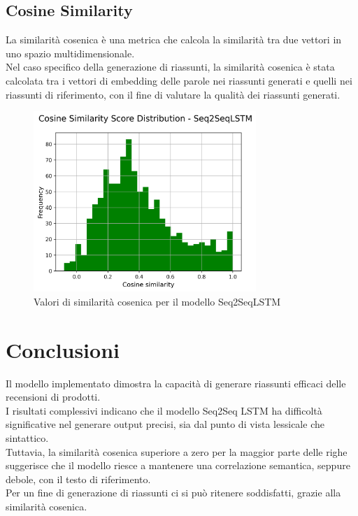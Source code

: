 \documentclass[a4paper, 12pt]{article}
\begin{document}
\subsection{Cosine Similarity}
La similarità cosenica è una metrica che calcola la similarità tra due vettori in uno spazio multidimensionale.\\
Nel caso specifico della generazione di riassunti, la similarità cosenica è stata calcolata tra i vettori di embedding delle parole nei riassunti generati e quelli nei riassunti di riferimento, con il fine di valutare la qualità dei riassunti generati.\\
\begin{figure}[H]
    \centering
    \includegraphics[width=0.75\textwidth]{media/Seq2SeqLSTM_cosine_similarity_scores.png}
    \caption{Valori di similarità cosenica per il modello Seq2SeqLSTM}
    \label{fig:cosine_similarity}
\end{figure}

\section{Conclusioni}
Il modello implementato dimostra la capacità di generare riassunti efficaci delle recensioni di prodotti.\\
I risultati complessivi indicano che il modello Seq2Seq LSTM ha difficoltà significative nel generare output precisi, sia dal punto di vista lessicale che sintattico. \\
Tuttavia, la similarità cosenica superiore a zero per la maggior parte delle righe suggerisce che il modello riesce a mantenere una correlazione semantica, seppure debole, con il testo di riferimento.\\
Per un fine di generazione di riassunti ci si può ritenere soddisfatti, grazie alla similarità cosenica.
\end{document}
